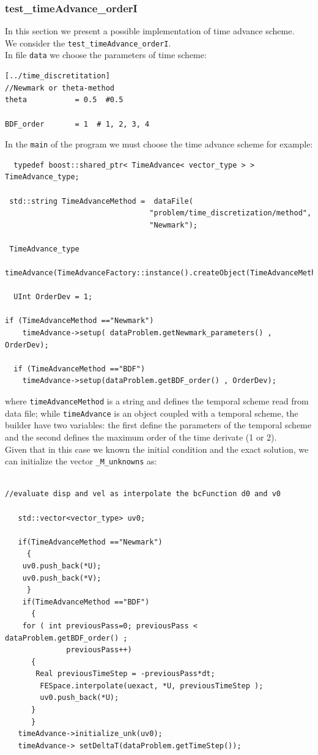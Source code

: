 \documentclass[english,a4paper]{article}
\begin{document}
\subsubsection{test\_timeAdvance\_orderI}
In this section we present a possible implementation of time advance
scheme.\\
We consider the \verb"test_timeAdvance_orderI".\\
In file  \verb"data" we choose the parameters of time scheme:
\begin{verbatim}
[../time_discretitation]
//Newmark or theta-method
theta           = 0.5  #0.5

BDF_order       = 1  # 1, 2, 3, 4
\end{verbatim}
In the \verb"main" of the program we must choose the time advance scheme for
example:
\begin{verbatim}
  typedef boost::shared_ptr< TimeAdvance< vector_type > >   TimeAdvance_type;

 std::string TimeAdvanceMethod =  dataFile(
                                 "problem/time_discretization/method",
                                 "Newmark");

 TimeAdvance_type
 timeAdvance(TimeAdvanceFactory::instance().createObject(TimeAdvanceMethod));

  UInt OrderDev = 1;

if (TimeAdvanceMethod =="Newmark")
    timeAdvance->setup( dataProblem.getNewmark_parameters() , OrderDev);

  if (TimeAdvanceMethod =="BDF")
    timeAdvance->setup(dataProblem.getBDF_order() , OrderDev);
\end{verbatim}
where \verb"timeAdvanceMethod" is a
string and defines the temporal scheme read  from data
file; while \verb"timeAdvance" is an object coupled with a temporal scheme,
the builder  have two variables: the first define the parameters of
the temporal scheme and the second
defines the maximum order of the
time derivate (1 or 2).\\
Given that in this case we known the initial condition and the exact
solution,  we can initialize the vector \verb"_M_unknowns" as:
\begin{verbatim}

//evaluate disp and vel as interpolate the bcFunction d0 and v0

   std::vector<vector_type> uv0;

   if(TimeAdvanceMethod =="Newmark")
     {
    uv0.push_back(*U);
    uv0.push_back(*V);
     }
    if(TimeAdvanceMethod =="BDF")
      {
	for ( int previousPass=0; previousPass < dataProblem.getBDF_order() ;
              previousPass++)
	  {
	   Real previousTimeStep = -previousPass*dt;
	    FESpace.interpolate(uexact, *U, previousTimeStep );
	    uv0.push_back(*U);
	  }
      }
   timeAdvance->initialize_unk(uv0);
   timeAdvance-> setDeltaT(dataProblem.getTimeStep());
\end{verbatim}
\end{document}
